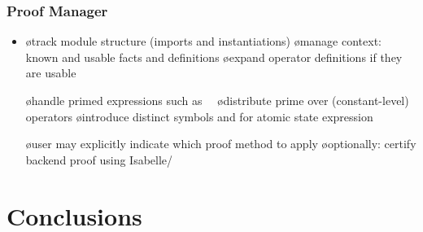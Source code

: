\documentclass[fleqn]{beamer}
\begin{document}
\begin{frame}
  \frametitle{Proof Manager}

  \begin{itemize}
  \item {}

    \begin{itemize}
    \o track module structure (imports and instantiations)
    \o manage context: known and usable facts and definitions
    \o expand operator definitions if they are usable
    \end{itemize}

  \oo {}

    \begin{itemize}
    \o handle primed expressions such as\ \ 
    \o distribute prime over (constant-level) operators
    \o introduce distinct symbols  and 
       for atomic state expression 
    \end{itemize}

  \oo {}

    \begin{itemize}
    \o user may explicitly indicate which proof method to apply
    \o optionally: certify backend proof using Isabelle/\tlaplus
    \end{itemize}
  \end{itemize}
\end{frame}

\section{Conclusions}
\end{document}
